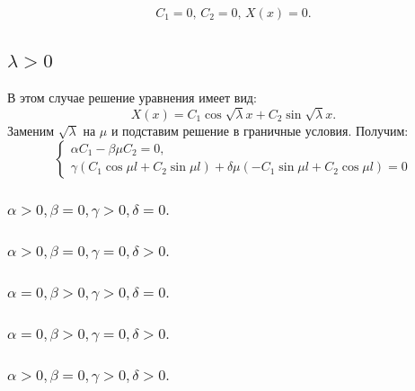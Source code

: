 \documentclass[12pt, a4paper]{article}
\begin{document}
\[ C_{1} = 0, \, C_{2} = 0, \, X(x) = 0. \]

\subsection{$\lambda > 0$}

В этом случае решение уравнения имеет вид:
\[ X(x) = C_{1} \cos \sqrt{\lambda} x + C_{2} \sin \sqrt{\lambda}x. \]
Заменим $\sqrt{\lambda}$ на $\mu$ и подставим решение в граничные условия. Получим:
\begin{displaymath}
	\begin{cases}
		\alpha C_{1} - \beta \mu C_{2} = 0, \\
		\gamma (C_{1} \cos \mu l + C_{2} \sin \mu l) + \delta \mu ( -C_{1} \sin \mu l + C_{2} \cos \mu l) = 0
	\end{cases}
\end{displaymath}

\subsubsection{ $ \alpha > 0, \beta = 0, \gamma > 0, \delta = 0. $}
\subsubsection{ $ \alpha > 0, \beta = 0, \gamma = 0, \delta > 0. $}
\subsubsection{ $ \alpha = 0, \beta > 0, \gamma > 0, \delta = 0. $}
\subsubsection{ $ \alpha = 0, \beta > 0, \gamma = 0, \delta > 0. $}
\subsubsection{ $ \alpha > 0, \beta = 0, \gamma > 0, \delta > 0. $}
\end{document}
